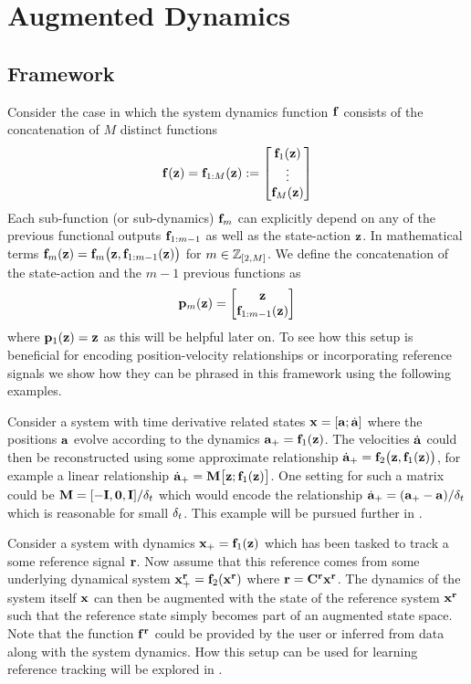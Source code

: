 \section{Augmented Dynamics} \label{sec:augmentedDYN}
\subsection{Framework}

Consider the case in which the system dynamics function $\mathbf{f}$ consists of the concatenation of $M$ distinct functions
\begin{equation}
\mathbf{f}(\mathbf{z}) = \mathbf{f}_{1:M}(\mathbf{z}) := \begin{bmatrix} \mathbf{f}_1(\mathbf{z}) \\ \vdots \\ \mathbf{f}_M(\mathbf{z}) \end{bmatrix}
\label{eqn:multimodel}
\end{equation}
Each sub-function (or sub-dynamics) $\mathbf{f}_m$ can explicitly depend on any of the previous functional outputs $\mathbf{f}_{1:m-1}$ as well as the state-action $\mathbf{z}$. In mathematical terms $\mathbf{f}_m(\mathbf{z}) = \mathbf{f}_m\big(\mathbf{z},\mathbf{f}_{1:m-1}(\mathbf{z})\big)$ for $m \in \mathbb{Z}_{[2,M]}$. We define the concatenation of the state-action and the $m-1$ previous functions as
\begin{equation*}
\mathbf{p}_m(\mathbf{z}) = \begin{bmatrix} \mathbf{z} \\ \mathbf{f}_{1:m-1}(\mathbf{z})  \end{bmatrix}
\end{equation*}
where $\mathbf{p}_1(\mathbf{z}) = \mathbf{z}$ as this will be helpful later on. To see how this setup is beneficial for encoding position-velocity relationships or incorporating reference signals we show how they can be phrased in this framework using the following examples.

\begin{exa} Consider a system with time derivative related states $\mathbf{x} = [\mathbf{a}; \dot{\mathbf{a}}]$ where the positions $\mathbf{a}$ evolve according to the dynamics $\mathbf{a}_+ = \mathbf{f}_1(\mathbf{z})$. The velocities $\dot{\mathbf{a}}$ could then be reconstructed using some approximate relationship $\dot{\mathbf{a}}_+ = \mathbf{f}_2\big(\mathbf{z},\mathbf{f}_1(\mathbf{z})\big)$, for example a linear relationship $\dot{\mathbf{a}}_+ = \mathbf{M}\big[\mathbf{z};\mathbf{f}_1(\mathbf{z})\big]$. One setting for such a matrix could be $\mathbf{M} = [-\mathbf{I}, \mathbf{0}, \mathbf{I}]/\delta_t$ which would encode the relationship $\dot{\mathbf{a}}_+ = (\mathbf{a}_+ - \mathbf{a})/\delta_t$ which is reasonable for small $\delta_t$. This example will be pursued further in .
\end{exa}

\begin{exa} Consider a system with dynamics $\mathbf{x}_+ = \mathbf{f}_1(\mathbf{z})$ which has been tasked to track a some reference signal $\mathbf{r}$. Now assume that this reference comes from some underlying dynamical system $\mathbf{x}^{\mathbf{r}}_+ = \mathbf{f}_2(\mathbf{x}^{\mathbf{r}})$ where $\mathbf{r} = \mathbf{C}^{\mathbf{r}}\mathbf{x}^{\mathbf{r}}$. The dynamics of the system itself $\mathbf{x}$ can then be augmented with the state of the reference system $\mathbf{x}^{\mathbf{r}}$ such that the reference state simply becomes part of an augmented state space. Note that the function $\mathbf{f}^{\mathbf{r}}$ could be provided by the user or inferred from data along with the system dynamics. How this setup can be used for learning reference tracking will be explored in .
\end{exa}


